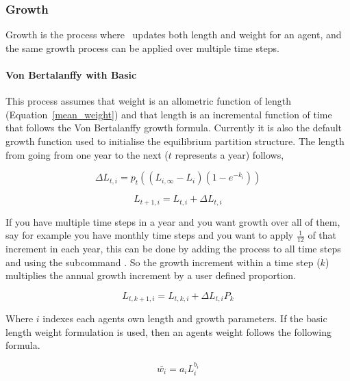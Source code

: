 \subsubsection{Growth}\label{sec:age-at-age}
Growth is the process where \IBM\ updates both length and weight for an agent, and the same growth process can be applied over multiple time steps.
\paragraph{Von Bertalanffy with Basic}\label{subsubsec:vonbert_basic}
This process assumes that weight is an allometric function of length (Equation~\ref{mean_weight}) and that length is an incremental function of time that follows the Von Bertalanffy growth formula. Currently it is also the default growth function used to initialise the equilibrium partition structure. The length from going from one year to the next ($t$ represents a year) follows,

\begin{equation}\label{VB}
\Delta L_{t,i} = p_t((L_{i,\infty} - L_i)(1 - e^{-k_i}))
\end{equation}

\begin{equation}\label{actual_growth}
L_{t+1,i} = L_{t,i} + \Delta L_{t,i}
\end{equation}

If you have multiple time steps in a year and you want growth over all of them, say for example you have monthly time steps and you want to apply $\frac{1}{12}$ of that increment in each year, this can be done by adding the process to all time steps and using the subcommand . So the growth increment within a time step ($k$) multiplies the annual growth increment by a user defined proportion.

\begin{equation}\label{actual_growth_in_time_step}
L_{t,k + 1,i} = L_{t,k,i} + \Delta L_{t,i}P_k
\end{equation}


Where $i$ indexes each agents own length and growth parameters. If the basic length weight formulation is used, then an agents weight follows the following formula.

\begin{equation}\label{mean_weight}
\bar{w_i} = a_iL_i^{b_i}
\end{equation}

